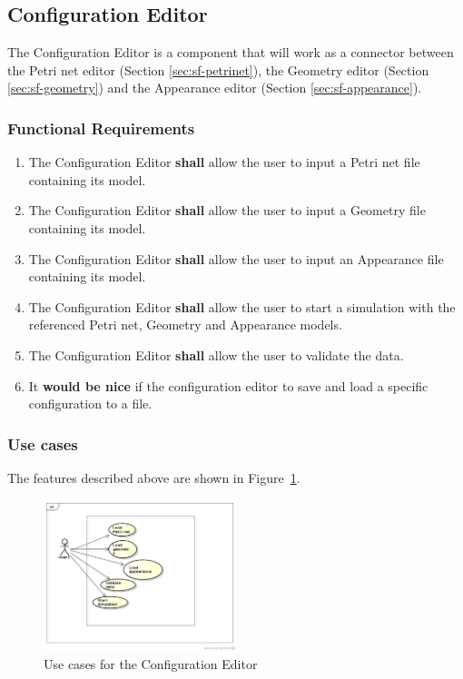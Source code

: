 \subsection{Configuration Editor}

The Configuration Editor is a component that will work as a connector between the Petri net editor (Section \ref{sec:sf-petrinet}), the Geometry editor (Section \ref{sec:sf-geometry}) and the Appearance editor (Section \ref{sec:sf-appearance}). 

\subsubsection{Functional Requirements}

\begin{enumerate}
	\item The Configuration Editor \textbf{shall} allow the user to input a Petri net file containing its model.
	\item The Configuration Editor \textbf{shall} allow the user to input a Geometry file containing its model.
	\item The Configuration Editor \textbf{shall} allow the user to input an Appearance file containing its model.
	\item The Configuration Editor \textbf{shall} allow the user to start a simulation with the referenced Petri net, Geometry and Appearance models.
	\item The Configuration Editor \textbf{shall} allow the user to validate the data.
	\item It \textbf{would be nice} if the configuration editor to save and load a specific configuration to a file.
\end{enumerate}

\subsubsection{Use cases}

The features described above are shown in Figure~\ref{fig:use-cases-configuration}.

\begin{figure}[htp]
\begin{center}
  \includegraphics[width=0.5\textwidth]{image/uc-configuration.png}
  \caption{Use cases for the Configuration Editor}
  \label{fig:use-cases-configuration}
\end{center}
\end{figure}